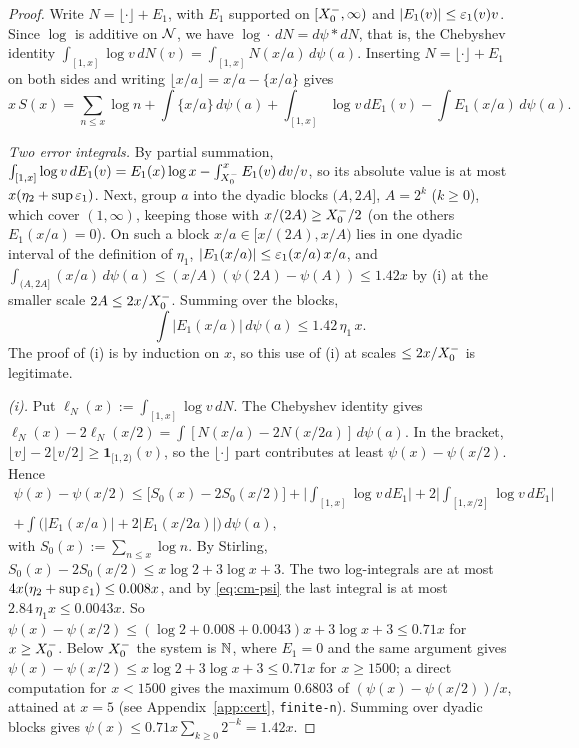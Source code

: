 \begin{proof}
Write $N=\lfloor\cdot\rfloor+E_1$, with $E_1$ supported on $[X_0^{-},\infty)$ and $|E_1(v)|\le\varepsilon_1(v)v$. Since $\log$ is
additive on $\mathcal{N}$, we have $\log\cdot\,dN=d\psi*dN$, that is, the Chebyshev identity
$\int_{[1,x]}\log v\,dN(v)=\int_{[1,x]}N(x/a)\,d\psi(a)$. Inserting $N=\lfloor\cdot\rfloor+E_1$ on both sides and writing
$\lfloor x/a\rfloor=x/a-\{x/a\}$ gives
\begin{equation}\label{eq:cm-identity}
  x\,S(x)=\sum_{n\le x}\log n+\int\{x/a\}\,d\psi(a)+\int_{[1,x]}\log v\,dE_1(v)-\int E_1(x/a)\,d\psi(a).
\end{equation}

\emph{Two error integrals.} By partial summation,
$\int_{[1,x]}\log v\,dE_1(v)=E_1(x)\log x-\int_{X_0^{-}}^xE_1(v)\,dv/v$, so its absolute value is at most
$x(\eta_2+\sup\varepsilon_1)$. Next, group $a$ into the dyadic blocks $(A,2A]$, $A=2^k$ ($k\ge0$), which cover $(1,\infty)$, keeping those
with $x/(2A)\ge X_0^{-}/2$ (on the others $E_1(x/a)=0$). On such a block $x/a\in[x/(2A),x/A)$ lies in one dyadic interval of the definition
of $\eta_1$, $|E_1(x/a)|\le\varepsilon_1(x/a)\,x/a$, and $\int_{(A,2A]}(x/a)\,d\psi(a)\le(x/A)(\psi(2A)-\psi(A))\le 1.42x$ by (i) at the
smaller scale $2A\le 2x/X_0^{-}$. Summing over the blocks,
\begin{equation}\label{eq:cm-psi}
  \int|E_1(x/a)|\,d\psi(a)\le 1.42\,\eta_1\,x .
\end{equation}
The proof of (i) is by induction on $x$, so this use of (i) at scales $\le 2x/X_0^{-}$ is legitimate.

\emph{(i).} Put $\ell_N(x):=\int_{[1,x]}\log v\,dN$. The Chebyshev identity gives
$\ell_N(x)-2\ell_N(x/2)=\int[N(x/a)-2N(x/2a)]\,d\psi(a)$. In the bracket, $\lfloor v\rfloor-2\lfloor v/2\rfloor\ge
\mathbf 1_{[1,2)}(v)$, so the $\lfloor\cdot\rfloor$ part contributes at least $\psi(x)-\psi(x/2)$. Hence
\begin{multline*}
  \psi(x)-\psi(x/2)\le\big[S_0(x)-2S_0(x/2)\big]+\Big|\int_{[1,x]}\!\log v\,dE_1\Big|+2\Big|\int_{[1,x/2]}\!\log v\,dE_1\Big|\\
  +\int\big(|E_1(x/a)|+2|E_1(x/2a)|\big)\,d\psi(a),
\end{multline*}
with $S_0(x):=\sum_{n\le x}\log n$. By Stirling, $S_0(x)-2S_0(x/2)\le x\log2+3\log x+3$. The two log-integrals are at
most $4x(\eta_2+\sup\varepsilon_1)\le 0.008x$, and by \eqref{eq:cm-psi} the last integral is at most
$2.84\,\eta_1x\le 0.0043x$. So
$\psi(x)-\psi(x/2)\le(\log2+0.008+0.0043)x+3\log x+3\le0.71x$ for $x\ge X_0^{-}$. Below $X_0^{-}$ the system is $\mathbb{N}$, where
$E_1=0$ and the same argument gives $\psi(x)-\psi(x/2)\le x\log2+3\log x+3\le0.71x$ for $x\ge1500$; a direct computation
for $x<1500$ gives the maximum $0.6803$ of $(\psi(x)-\psi(x/2))/x$, attained at $x=5$ (see Appendix~\ref{app:cert},
\texttt{finite-n}). Summing over dyadic blocks gives
$\psi(x)\le 0.71x\sum_{k\ge0}2^{-k}=1.42x$.


\end{proof}

